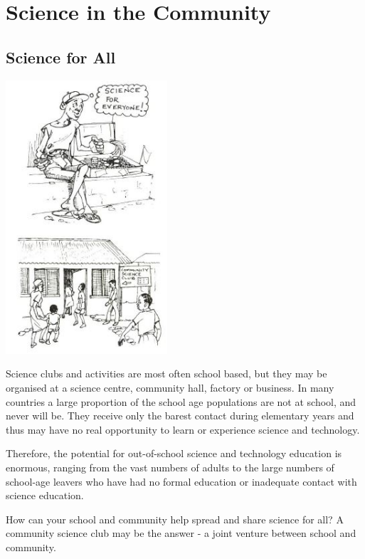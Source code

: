 \chapter{Science in the Community} 

\begin{multicols}{2}


\section{Science for All}

\begin{center}
\includegraphics[width=0.45\textwidth]{./img/source/science-for-all.jpg}
\end{center}

Science clubs and activities are most often school based,
but they may be organised at a science centre,
community hall, factory or business.
In many countries a large proportion of the
school age populations are not at school, and
never will be. They receive only the barest
contact during elementary years and thus may
have no real opportunity to learn or experience
science and technology. 

Therefore, the potential
for out-of-school science and technology
education is enormous, ranging from the vast
numbers of adults to the large numbers of school-age
leavers who have had no formal education
or inadequate contact with science education.

How can your school and community help
spread and share science for all?
A community science club may be the answer - a
joint venture between school and community.



\end{multicols}
